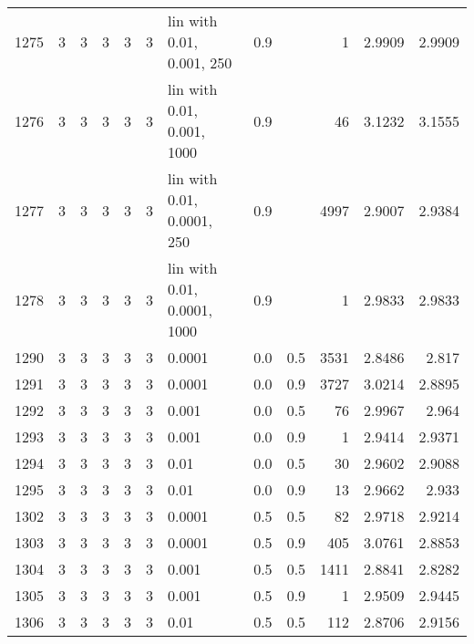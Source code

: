 \begin{longtable}{lrrrrrlrrrrr}
1275 &       3 & 3 & 3 & 3 & 3 &   lin with 0.01, 0.001, 250 &  0.9 &        &       1 &                 2.9909 &                 2.9909 \\
1276 &       3 & 3 & 3 & 3 & 3 &  lin with 0.01, 0.001, 1000 &  0.9 &        &      46 &                 3.1232 &                 3.1555 \\
1277 &       3 & 3 & 3 & 3 & 3 &  lin with 0.01, 0.0001, 250 &  0.9 &        &    4997 &                 2.9007 &                 2.9384 \\
1278 &       3 & 3 & 3 & 3 & 3 & lin with 0.01, 0.0001, 1000 &  0.9 &        &       1 &                 2.9833 &                 2.9833 \\
1290 &       3 & 3 & 3 & 3 & 3 &                      0.0001 &  0.0 &    0.5 &    3531 &                 2.8486 &                  2.817 \\
1291 &       3 & 3 & 3 & 3 & 3 &                      0.0001 &  0.0 &    0.9 &    3727 &                 3.0214 &                 2.8895 \\
1292 &       3 & 3 & 3 & 3 & 3 &                       0.001 &  0.0 &    0.5 &      76 &                 2.9967 &                  2.964 \\
1293 &       3 & 3 & 3 & 3 & 3 &                       0.001 &  0.0 &    0.9 &       1 &                 2.9414 &                 2.9371 \\
1294 &       3 & 3 & 3 & 3 & 3 &                        0.01 &  0.0 &    0.5 &      30 &                 2.9602 &                 2.9088 \\
1295 &       3 & 3 & 3 & 3 & 3 &                        0.01 &  0.0 &    0.9 &      13 &                 2.9662 &                  2.933 \\
1302 &       3 & 3 & 3 & 3 & 3 &                      0.0001 &  0.5 &    0.5 &      82 &                 2.9718 &                 2.9214 \\
1303 &       3 & 3 & 3 & 3 & 3 &                      0.0001 &  0.5 &    0.9 &     405 &                 3.0761 &                 2.8853 \\
1304 &       3 & 3 & 3 & 3 & 3 &                       0.001 &  0.5 &    0.5 &    1411 &                 2.8841 &                 2.8282 \\
1305 &       3 & 3 & 3 & 3 & 3 &                       0.001 &  0.5 &    0.9 &       1 &                 2.9509 &                 2.9445 \\
1306 &       3 & 3 & 3 & 3 & 3 &                        0.01 &  0.5 &    0.5 &     112 &                 2.8706 &                 2.9156 \\

\end{longtable}
